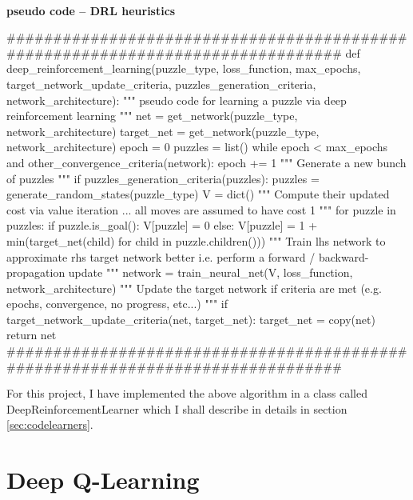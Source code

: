 \paragraph{}{\textbf{pseudo code -- \textbf{DRL} heuristics}}
\begin{pseudocode}
###############################################################################
def deep_reinforcement_learning(puzzle_type,
                                loss_function,
                                max_epochs,
                                target_network_update_criteria,
                                puzzles_generation_criteria,
                                network_architecture):
    """ pseudo code for learning a puzzle via deep reinforcement learning """
    net = get_network(puzzle_type, network_architecture)
    target_net = get_network(puzzle_type, network_architecture)
    epoch = 0
    puzzles = list()
    while epoch < max_epochs and other_convergence_criteria(network):
        epoch += 1
        """ Generate a new bunch of puzzles """
        if puzzles_generation_criteria(puzzles):
            puzzles = generate_random_states(puzzle_type)
        V = dict()
        """ Compute their updated cost via value iteration ... 
             all moves are assumed to have cost 1 """
        for puzzle in puzzles:
            if puzzle.is_goal():
                V[puzzle] = 0
            else:
                V[puzzle] = 1 + min(target_net(child) for child in puzzle.children()))
        """ Train lhs network to approximate rhs target network better
        i.e. perform a forward / backward-propagation update
        """
        network = train_neural_net(V,
                                   loss_function,
                                   network_architecture)
        """ Update the target network if criteria are met 
        (e.g. epochs, convergence, no progress, etc...) """
        if target_network_update_criteria(net, target_net):
            target_net = copy(net)
    return net
###############################################################################
\end{pseudocode}
\black
For this project, I have implemented the above algorithm in a class called DeepReinforcementLearner which I shall describe in details in section \ref{sec:codelearners}.



\section{Deep Q-Learning}

